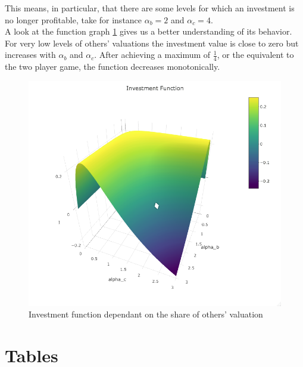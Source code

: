 \begin{appendices}
This means, in particular, that there are some levels for which an investment is no longer profitable, take for instance $\alpha_b = 2$ and $\alpha_c = 4$.\\

A look at the function graph \ref{fig:invest_func} gives us a better understanding of its behavior. For very low levels of others' valuations the investment value is close to zero but increases with $\alpha_b$ and $\alpha_c$. After achieving a maximum of $\frac{1}{4}$, or the equivalent to the two player game, the function decreases monotonically.

\begin{figure}[H]
    \centering
    \includegraphics[scale=0.5]{graphs/Investment_Func.png}
    \caption{Investment function dependant on the share of others' valuation}
    \label{fig:invest_func}
\end{figure}

\chapter{Tables}


\end{appendices}

